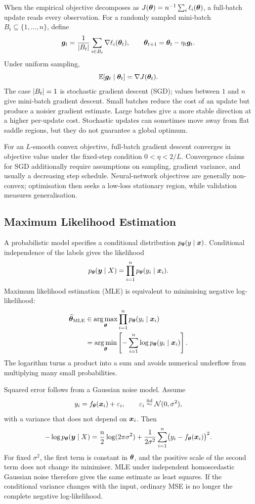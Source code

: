 When the empirical objective decomposes as
$J(\bm{\theta})=n^{-1}\sum_i\ell_i(\bm{\theta})$, a full-batch update reads every observation. For a randomly sampled mini-batch $B_t\subseteq\{1,\ldots,n\}$, define
\[
  \bm{g}_t
  =\frac{1}{\left\lvert B_t\right\rvert}
    \sum_{i\in B_t}\nabla\ell_i(\bm{\theta}_t),
  \qquad
  \bm{\theta}_{t+1}=\bm{\theta}_t-\eta_t\bm{g}_t.
\]
Under uniform sampling,
\[
  \mathbb{E}[\bm{g}_t\mid\bm{\theta}_t]=\nabla J(\bm{\theta}_t).
\]
The case $\left\lvert B_t\right\rvert=1$ is stochastic gradient descent (SGD); values between $1$ and $n$ give mini-batch gradient descent. Small batches reduce the cost of an update but produce a noisier gradient estimate. Large batches give a more stable direction at a higher per-update cost. Stochastic updates can sometimes move away from flat saddle regions, but they do not guarantee a global optimum.

\OptimisationPathFigure

For an $L$-smooth convex objective, full-batch gradient descent converges in objective value under the fixed-step condition $0<\eta<2/L$. Convergence claims for SGD additionally require assumptions on sampling, gradient variance, and usually a decreasing step schedule. Neural-network objectives are generally non-convex; optimisation then seeks a low-loss stationary region, while validation measures generalisation.

\subsection{Maximum Likelihood Estimation}

A probabilistic model specifies a conditional distribution $p_{\bm{\theta}}(y\mid\bm{x})$. Conditional independence of the labels gives the likelihood
\[
  p_{\bm{\theta}}(\bm{y}\mid X)
  =\prod_{i=1}^{n}p_{\bm{\theta}}(y_i\mid\bm{x}_i).
\]
Maximum likelihood estimation (MLE) is equivalent to minimising negative log-likelihood:
\begin{align*}
  \widehat{\bm{\theta}}_{\mathrm{MLE}}
  &\in\operatorname*{arg\,max}_{\bm{\theta}}
    \prod_{i=1}^{n}p_{\bm{\theta}}(y_i\mid\bm{x}_i)\\
  &=\operatorname*{arg\,min}_{\bm{\theta}}
    \left[-\sum_{i=1}^{n}\log p_{\bm{\theta}}(y_i\mid\bm{x}_i)\right].
\end{align*}
The logarithm turns a product into a sum and avoids numerical underflow from multiplying many small probabilities.

Squared error follows from a Gaussian noise model. Assume
\[
  y_i=f_{\bm{\theta}}(\bm{x}_i)+\varepsilon_i,
  \qquad
  \varepsilon_i\overset{\mathrm{iid}}{\sim}\mathcal N(0,\sigma^2),
\]
with a variance that does not depend on $\bm{x}_i$. Then
\[
  -\log p_{\bm{\theta}}(\bm{y}\mid X)
  =\frac n2\log(2\pi\sigma^2)
   +\frac{1}{2\sigma^2}
      \sum_{i=1}^{n}
      \bigl(y_i-f_{\bm{\theta}}(\bm{x}_i)\bigr)^2.
\]
For fixed $\sigma^2$, the first term is constant in $\bm{\theta}$, and the positive scale of the second term does not change its minimiser. MLE under independent homoscedastic Gaussian noise therefore gives the same estimate as least squares. If the conditional variance changes with the input, ordinary MSE is no longer the complete negative log-likelihood.

